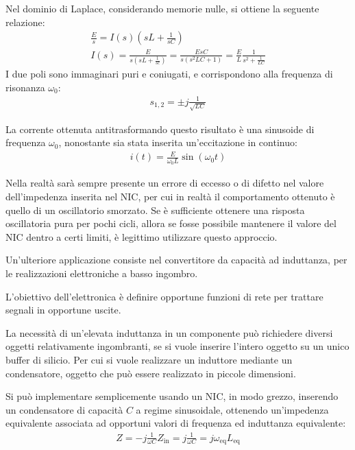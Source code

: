 \documentclass{article}
\numberwithin{equation}{subsection}
\begin{document}
Nel dominio di Laplace, considerando memorie nulle, si ottiene la seguente relazione:
\begin{gather*}
    \displaystyle\frac{E}{s}=I(s)\left(sL+\frac{1}{sC}\right)\\
    I(s)=\displaystyle\frac{E}{s\left(sL+\displaystyle\frac{1}{sc}\right)}=\frac{EsC}{s\left(s^2LC+1\right)}=\frac{E}{L}\frac{1}{s^2+\displaystyle\frac{1}{LC}}
\end{gather*}
I due poli sono immaginari puri e coniugati, e corrispondono alla frequenza di risonanza $\omega_0$:
\begin{gather*}
    s_{1,2}=\pm j\displaystyle\frac{1}{\sqrt {LC}}
\end{gather*}

La corrente ottenuta antitrasformando questo risultato è una sinusoide di frequenza $\omega_0$, nonostante sia stata inserita un'eccitazione in 
continuo:
\begin{gather*}
    i(t)=\displaystyle\frac{E}{\omega_0L}\sin(\omega_0t)
\end{gather*}

Nella realtà sarà sempre presente un errore di eccesso o di difetto nel valore dell'impedenza inserita nel NIC, per cui in realtà il comportamento 
ottenuto è quello di un oscillatorio smorzato. Se è sufficiente ottenere una risposta oscillatoria pura per pochi cicli, allora se fosse 
possibile mantenere il valore del NIC dentro a certi limiti, è legittimo utilizzare questo approccio. 


Un'ulteriore applicazione consiste nel convertitore da capacità ad induttanza, per le realizzazioni elettroniche a basso ingombro. 

L'obiettivo dell'elettronica è definire opportune funzioni di rete per trattare segnali in opportune uscite. 

La necessità di un'elevata induttanza in un componente può richiedere diversi oggetti relativamente ingombranti, se si vuole 
inserire l'intero oggetto su un unico buffer di silicio. Per cui si vuole realizzare un induttore mediante un condensatore, oggetto che può 
essere realizzato in piccole dimensioni. 

Si può implementare semplicemente usando un NIC, in modo grezzo, inserendo un condensatore di capacità $C$ a regime sinusoidale, ottenendo un'impedenza 
equivalente associata ad opportuni valori di frequenza ed induttanza equivalente:
\begin{gather*}
    Z=\displaystyle-j\frac{1}{\omega C}
    Z_\mathrm{in}=\displaystyle j\frac{1}{\omega C}=j\omega_\mathrm{eq}L_\mathrm{eq}
\end{gather*}
\end{document}
